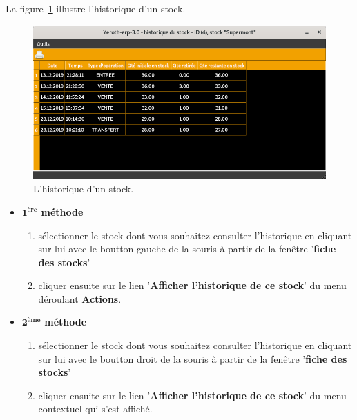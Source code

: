 La figure~\ref{fig:fenetre-historique-dun-stock}
illustre l'historique d'un stock.

\begin{figure}[!htbp]
	\centering
	\includegraphics[scale=0.63]{images/yeroth-historique-stock.png}
	\caption{L'historique d'un stock.}
	\label{fig:fenetre-historique-dun-stock}
\end{figure}

\begin{itemize}[]
	\item \textcolor{purplish}{$\mathbf{1^{\text{\`ere}}}$ \textbf{m\'ethode}}
	\begin{enumerate}[1)]
		\item s\'electionner le stock dont vous souhaitez
		consulter l'historique en cliquant sur lui avec
		le boutton gauche de la souris
		\` a partir de la fen\^etre '\textbf{fiche des stocks}'
		
		\item cliquer ensuite sur le lien
		 '\textbf{Afficher l'historique de ce stock}' du
		 menu d\'eroulant \textbf{Actions}.\\
	\end{enumerate}
	
	\item \textcolor{purplish}{$\mathbf{2^{\text{\`eme}}}$ \textbf{m\'ethode}}
	\begin{enumerate}[1)]
		\item s\'electionner le stock dont vous souhaitez
		consulter l'historique en cliquant sur lui avec
		le boutton droit de la souris
		\` a partir de la fen\^etre '\textbf{fiche des stocks}'
		
		\item cliquer ensuite sur le lien
		 '\textbf{Afficher l'historique de ce stock}' du
		 menu contextuel qui s'est affich\'e.\\
	\end{enumerate}
	
\end{itemize}

